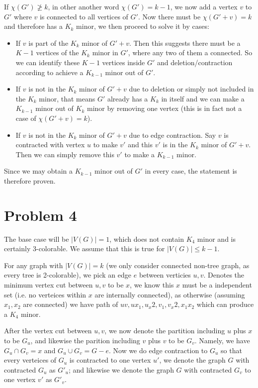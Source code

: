 \documentclass[11pt]{article}
\begin{document}
If $\chi(G') \not \geq k$, in other another word  $\chi(G') = k-1$, we now add a vertex $v$ to $G'$ where $v$ is connected to all vertices of $G'$. Now there must be $\chi(G' + v) = k$ and therefore has a $K_k$ minor, we then proceed to solve it by cases:

\begin{itemize}
    \item If $v$ is part of the $K_k$ minor of $G' + v$. Then this suggests there must be a $K-1$ vertices of the $K_k$ minor in $G'$, where any two of them a connected. So we can identify these $K-1$ vertices inside $G'$ and deletion/contraction according to achieve a $K_{k-1}$ minor out of $G'$.
    \item If $v$ is not in the $K_k$ minor of $G' + v$ due to deletion or simply not included in the $K_k$ minor, that means $G'$ already has a $K_k$ in itself and we can make a $K_{k-1}$ minor out of $K_k$ minor by removing one vertex (this is in fact not a case of $\chi(G' + v) = k$).
    \item If $v$ is not in the $K_k$ minor of $G' + v$ due to edge contraction. Say $v$ is contracted with vertex $u$ to make $v'$ and this $v'$ is in the $K_k$ minor of $G' + v$. Then we can simply remove this $v'$ to make a $K_{k-1}$ minor.
\end{itemize}

Since we may obtain a $K_{k-1}$ minor out of $G'$ in every case, the statement is therefore proven.

\section*{Problem 4}


The base case will be $|V(G)|=1$, which does not contain $K_4$ minor and is certainly 3-colorable. We assume that this is true for $|V(G)| \leq k-1$.\newline

For any graph with $|V(G)| = k$ (we only consider connected non-tree graph, as every tree is 2-colorable), we pick an edge $e$ between verticies $u, v$. Denotes the minimum vertex cut between $u, v$ to be $x$, we know this $x$ must be a independent set (i.e. no verteices within $x$ are internally connected), as otherwise (assuming $x_1, x_2$ are connected) we have path of $uv, ux_1, u_x2, v_1, v_x2, x_1 x_2$ which can produce a $K_4$ minor.

After the vertex cut between $u, v$, we now denote the partition including $u$ plus $x$ to be $G_u$, and likewise the parition including $v$ plus $v$ to be $G_v$. Namely, we have $G_u \cap G_v = x$ and $G_u \cup G_v = G - e$. Now we do edge contraction to $G_u$ so that every verteices of $G_u$ is contracted to one vertex $u'$, we denote the graph $G$ with contracted $G_u$ as $G'_u$; and likewise we denote the graph $G$ with contracted $G_v$ to one vertex $v'$ as $G'_v$.\newline
\end{document}
